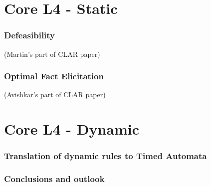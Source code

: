 \documentclass{beamer}
\begin{document}
\section{Core L4 - Static}


\begin{frame}[fragile]\frametitle{Defeasibility}

  (Martin's part of CLAR paper)

\end{frame}

\begin{frame}[fragile]\frametitle{Optimal Fact Elicitation} 

  (Avishkar's part of CLAR paper)

\end{frame}


\section{Core L4 - Dynamic}


\begin{frame}[fragile]\frametitle{Translation of dynamic rules to Timed Automata}



\end{frame}

\begin{frame}[fragile]\frametitle{Conclusions and outlook}




\end{frame}



\end{document}
